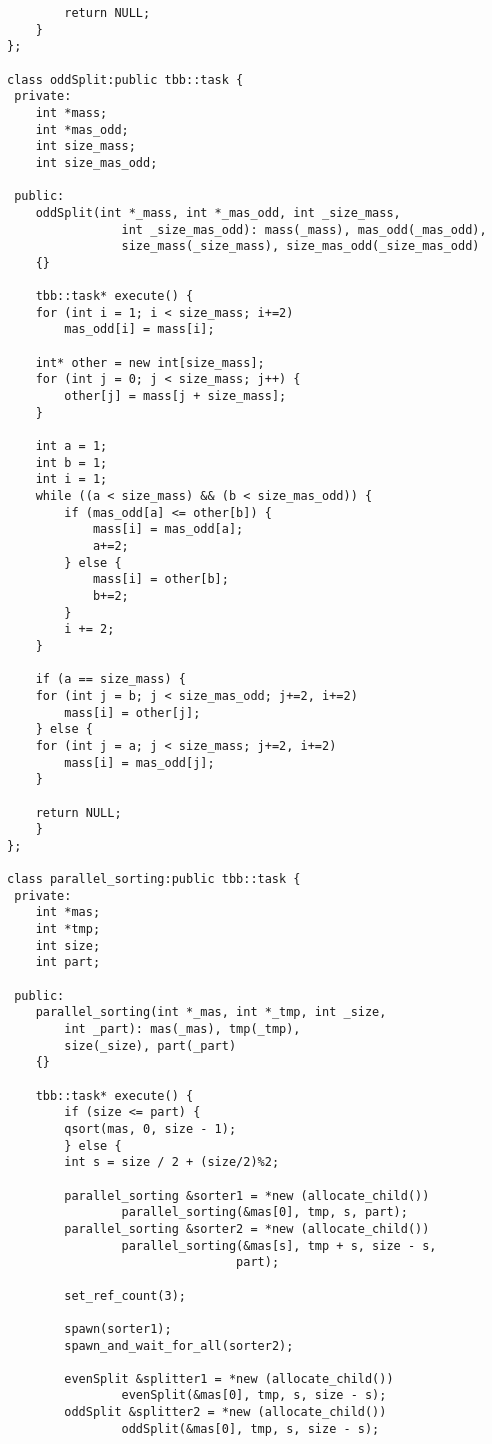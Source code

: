 \documentclass{report}
\begin{document}
\begin{lstlisting}
        return NULL;
    }
};

class oddSplit:public tbb::task {
 private:
    int *mass;
    int *mas_odd;
    int size_mass;
    int size_mas_odd;

 public:
    oddSplit(int *_mass, int *_mas_odd, int _size_mass,
                int _size_mas_odd): mass(_mass), mas_odd(_mas_odd),
                size_mass(_size_mass), size_mas_odd(_size_mas_odd)
    {}

    tbb::task* execute() {
    for (int i = 1; i < size_mass; i+=2)
        mas_odd[i] = mass[i];

    int* other = new int[size_mass];
    for (int j = 0; j < size_mass; j++) {
        other[j] = mass[j + size_mass];
    }

    int a = 1;
    int b = 1;
    int i = 1;
    while ((a < size_mass) && (b < size_mas_odd)) {
        if (mas_odd[a] <= other[b]) {
            mass[i] = mas_odd[a];
            a+=2;
        } else {
            mass[i] = other[b];
            b+=2;
        }
        i += 2;
    }

    if (a == size_mass) {
    for (int j = b; j < size_mas_odd; j+=2, i+=2)
        mass[i] = other[j];
    } else {
    for (int j = a; j < size_mass; j+=2, i+=2)
        mass[i] = mas_odd[j];
    }

    return NULL;
    }
};

class parallel_sorting:public tbb::task {
 private:
    int *mas;
    int *tmp;
    int size;
    int part;

 public:
    parallel_sorting(int *_mas, int *_tmp, int _size,
        int _part): mas(_mas), tmp(_tmp),
        size(_size), part(_part)
    {}

    tbb::task* execute() {
        if (size <= part) {
        qsort(mas, 0, size - 1);
        } else {
        int s = size / 2 + (size/2)%2;

        parallel_sorting &sorter1 = *new (allocate_child())
                parallel_sorting(&mas[0], tmp, s, part);
        parallel_sorting &sorter2 = *new (allocate_child())
                parallel_sorting(&mas[s], tmp + s, size - s,
                                part);

        set_ref_count(3);

        spawn(sorter1);
        spawn_and_wait_for_all(sorter2);

        evenSplit &splitter1 = *new (allocate_child())
                evenSplit(&mas[0], tmp, s, size - s);
        oddSplit &splitter2 = *new (allocate_child())
                oddSplit(&mas[0], tmp, s, size - s);


\end{lstlisting}
\end{document}
